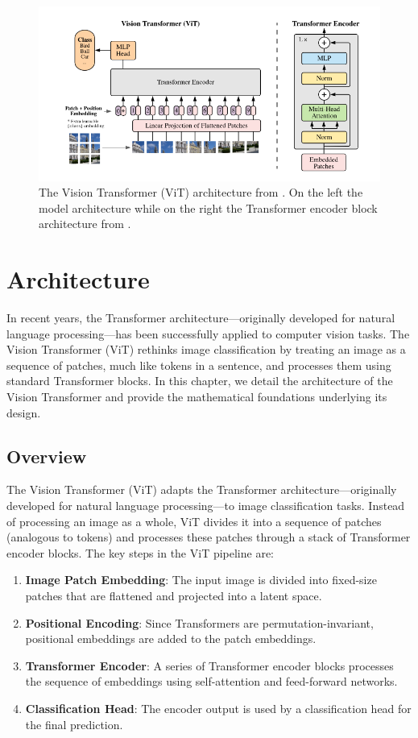 \begin{figure}[t]
    \center
    \includegraphics[width=1\textwidth]{images/vit-architecture.png}
    \caption{The Vision Transformer (ViT) architecture from \cite{alexey2020image}. On the left the model architecture while on the right the Transformer encoder block architecture from \cite{vaswani2017attention}.}
    \label{fig:vit-architecture}
\end{figure}

\section{Architecture}

In recent years, the Transformer architecture—originally developed for natural language processing—has been successfully applied to computer vision tasks. The Vision Transformer (ViT) rethinks image classification by treating an image as a sequence of patches, much like tokens in a sentence, and processes them using standard Transformer blocks. In this chapter, we detail the architecture of the Vision Transformer and provide the mathematical foundations underlying its design.

\subsection{Overview}
The Vision Transformer (ViT) adapts the Transformer architecture—originally developed for natural language processing—to image classification tasks. Instead of processing an image as a whole, ViT divides it into a sequence of patches (analogous to tokens) and processes these patches through a stack of Transformer encoder blocks. The key steps in the ViT pipeline are:
\begin{enumerate}
    \item \textbf{Image Patch Embedding}: The input image is divided into fixed-size patches that are flattened and projected into a latent space.
    \item \textbf{Positional Encoding}: Since Transformers are permutation-invariant, positional embeddings are added to the patch embeddings.
    \item \textbf{Transformer Encoder}: A series of Transformer encoder blocks processes the sequence of embeddings using self-attention and feed-forward networks.
    \item \textbf{Classification Head}: The encoder output is used by a classification head for the final prediction.
\end{enumerate}

